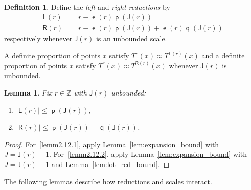 \documentclass[10pt]{amsart}
\newtheorem{lemm}[theo]{Lemma}\newtheorem{prop}[theo]{Proposition}\newtheorem{coro}[theo]{Corollary}\newtheorem{conj}[theo]{Conjecture}
\theoremstyle{definition}\newtheorem{defi}[theo]{Definition}\newtheorem{rema}[theo]{Remark}\newtheorem{exam}[theo]{Example}\newtheorem{exem}[theo]{Example}\newtheorem{nota}[theo]{Notation}
\DeclareMathOperator{\lst}{\mathsf{e}}
\DeclareMathOperator{\p}{\mathsf{p}}
\DeclareMathOperator{\q}{\mathsf{q}}
\newcommand{\Z}{\mathbb{Z}}
\newcommand{\lft}{\mathsf{L}}
\newcommand{\rht}{\mathsf{R}}
\newcommand{\scl}{\mathsf{J}}
\begin{document}
\begin{defi}\label{def:reduction}
Define the
\emph{left} and
\emph{right reductions} by
\begin{align*}
\lft(r) &= r - \lst(r) \p(\scl(r)) \\
\rht(r) &= r - \lst(r) \p(\scl(r)) + \lst(r) \q(\scl(r))
\end{align*}
respectively whenever $\scl(r)$ is an unbounded scale.
\end{defi}

A definite proportion of points $x$ satisfy $T^r(x) \approx T^{\lft(r)}(x)$ and a definite proportion of points $x$ satisfy $T^r(x) \approx T^{\rht(r)}(x)$ whenever $\scl(r)$ is unbounded.

\begin{lemm}\label{lem:need it later}
Fix $r \in \Z$ with $\scl(r)$ unbounded:
\begin{enumerate}
\item\label{lemm2.12.1} $|\lft(r)| \le \p(\scl(r))$,
\item\label{lemm2.12.2} $|\rht(r)| \le \p(\scl(r)) - \q(\scl(r))$.
\end{enumerate}
\end{lemm}
\begin{proof}
For~\eqref{lemm2.12.1}, apply Lemma~\ref{lem:expansion_bound} with $J = \scl(r) - 1$. For~\eqref{lemm2.12.2}, apply Lemma~\ref{lem:expansion_bound} with $J =
\scl(r) - 1$ and Lemma~\ref{lem:lot_red_bound}.
\end{proof}

The following lemmas describe how reductions and scales interact.
\end{document}
